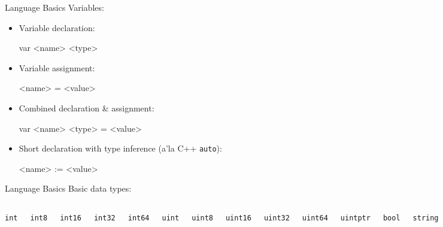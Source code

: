 \documentclass[pdf,xcolor=dvipsnames,noparindent]{beamer}
\begin{document}
\begin{frame}[fragile]{Language Basics}
  \pause
  Variables:
  \pause
  \begin{itemize}
  \item Variable declaration:
    \begin{semiverbatim}
      var <name> <type>
    \end{semiverbatim}
    \pause
  \item Variable assignment:
    \begin{semiverbatim}
      <name> = <value>
    \end{semiverbatim}
    \pause
  \item Combined declaration \& assignment:
    \begin{semiverbatim}
      var <name> <type> = <value>
    \end{semiverbatim}
    \pause
  \item Short declaration with type inference (a'la C++ \texttt{auto}):
    \begin{semiverbatim}
      <name> := <value>
    \end{semiverbatim}
  \end{itemize}
\end{frame}

\begin{frame}{Language Basics}
  \pause
  Basic data types:
  \pause
  \begin{itemize}
    \begin{columns}
    \item \texttt{int}
    \item \texttt{int8}
    \item \texttt{int16}
    \item \texttt{int32}
    \item \texttt{int64}
      \pause
    \item \texttt{uint}
    \item \texttt{uint8}
    \item \texttt{uint16}
    \item \texttt{uint32}
    \item \texttt{uint64}
    \item \texttt{uintptr}
      \pause
    \item \texttt{bool}
      \pause
    \item \texttt{string}
      \pause
    \item \texttt{byte}
    \item \texttt{rune}
      \pause
    \item \texttt{float32}
    \item \texttt{float64}
      \pause
    \item \texttt{complex64}
    \item \texttt{complex128}
      \end{columns}
  \end{itemize}
\end{frame}
\end{document}
